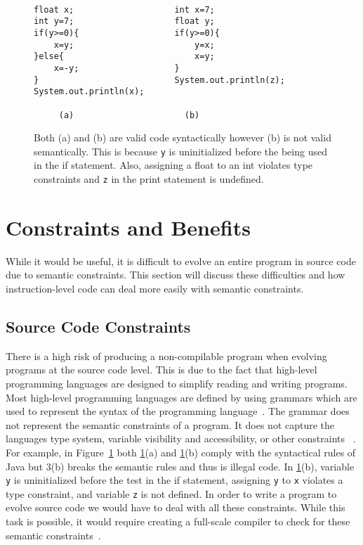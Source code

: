 \documentclass{sig-alternate}
\begin{document}
\begin{figure}
\centering
{\tt
\begin{verbatim}
float x;                    int x=7;
int y=7;                    float y;
if(y>=0){                   if(y>=0){
    x=y;                        y=x;
}else{                          x=y;
    x=-y;                   }
}                           System.out.println(z);
System.out.println(x);	
     
     (a)                      (b)

\end{verbatim}
}
\caption{Both (a) and (b) are valid code syntactically however (b) is not valid semantically. This is because \texttt{y} is uninitialized before the being used in the if statement. Also, assigning a float to an int violates type constraints and \texttt{z} in the print statement is undefined.}
\label{semantics}
\end{figure}



\section{Constraints and Benefits}

While it would be useful, it is difficult to evolve an entire program in source code due to semantic constraints. This section will discuss these difficulties and how instruction-level code can deal more easily with semantic constraints.  

\subsection{Source Code Constraints}
There is a high risk of producing a non-compilable program when evolving programs at the source code level. This is due to the fact that high-level programming languages are designed to simplify reading and writing programs. Most high-level programming languages are defined by using grammars which are used to represent the syntax of the programming language~\cite{Oracle:2013,Assembly:2010}. The grammar does not represent the semantic constraints of a program. It does not capture the languages type system, variable visibility and accessibility, or other constraints ~\cite{FINCH:2011}. For example, in Figure~\ref{semantics} both \ref{semantics}(a) and \ref{semantics}(b) comply with the syntactical rules of Java but 3(b) breaks the semantic rules and thus is illegal code. In \ref{semantics}(b), variable \texttt{y} is uninitialized before the test in the if statement, assigning \texttt{y} to \texttt{x} violates a type constraint, and variable \texttt{z} is not defined. In order to write a program to evolve source code we would have to deal with all these constraints. While this task is possible, it would require creating a full-scale compiler to check for these semantic constraints~\cite{FINCH:2011}.\par
\end{document}
